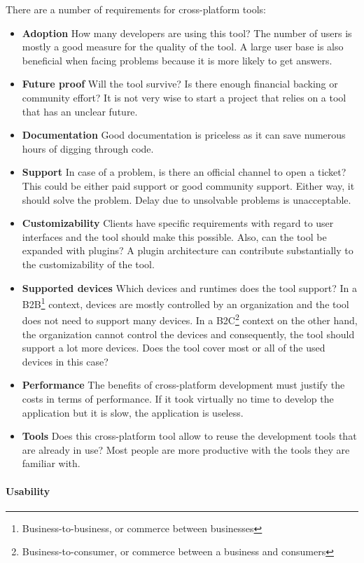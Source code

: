 There are a number of requirements for cross-platform tools:
\begin{itemize}
    \item \textbf{Adoption} How many developers are using this tool? The number of users is mostly a good measure for the quality of the tool. A large user base is also beneficial when facing problems because it is more likely to get answers.
    \item \textbf{Future proof} Will the tool survive? Is there enough financial backing or community effort? It is not very wise to start a project that relies on a tool that has an unclear future. 
    \item \textbf{Documentation} Good documentation is priceless as it can save numerous hours of digging through code. 
    \item \textbf{Support} In case of a problem, is there an official channel to open a ticket? This could be either paid support or good community support. Either way, it should solve the problem. Delay due to unsolvable problems is unacceptable.
    \item \textbf{Customizability} Clients have specific requirements with regard to user interfaces and the tool should make this possible. Also, can the tool be expanded with plugins? A plugin architecture can contribute substantially to the customizability of the tool.
    \item \textbf{Supported devices} Which devices and runtimes does the tool support? In a B2B\footnote{Business-to-business, or commerce between businesses} context, devices are mostly controlled by an organization and the tool does not need to support many devices. In a B2C\footnote{Business-to-consumer, or commerce between a business and consumers} context on the other hand, the organization cannot control the devices and consequently, the tool should support a lot more devices. Does the tool cover most or all of the used devices in this case?
    \item \textbf{Performance} The benefits of cross-platform development must justify the costs in terms of performance. If it took virtually no time to develop the application but it is slow, the application is useless. 
    \item \textbf{Tools} Does this cross-platform tool allow to reuse the development tools that are already in use? Most people are more productive with the tools they are familiar with.
\end{itemize}

\paragraph{Usability} 

